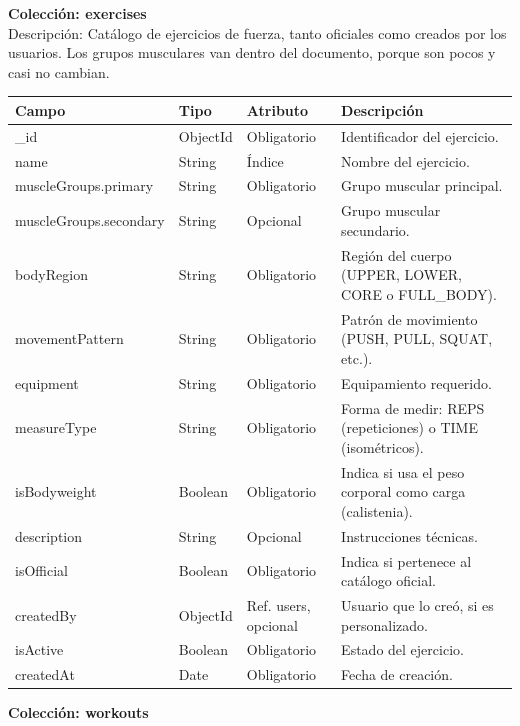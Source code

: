 \newpage
\noindent\textbf{Colección: exercises} \\
Descripción: Catálogo de ejercicios de fuerza, tanto oficiales como creados por los usuarios. Los grupos musculares van dentro del documento, porque son pocos y casi no cambian.
{\footnotesize
\renewcommand{\arraystretch}{1.2}
\begin{longtable}{|>{\raggedright\arraybackslash}p{4.7cm}|>{\raggedright\arraybackslash}p{1.8cm}|>{\raggedright\arraybackslash}p{2.3cm}|>{\raggedright\arraybackslash}p{5.4cm}|}
    \hline
    \rowcolor[HTML]{EFEFEF}
    \textbf{Campo} & \textbf{Tipo} & \textbf{Atributo} & \textbf{Descripción} \\ \hline
    \endhead
    \_id & ObjectId & Obligatorio & Identificador del ejercicio. \\ \hline
    name & String & Índice & Nombre del ejercicio. \\ \hline
    muscleGroups.\allowbreak primary & String & Obligatorio & Grupo muscular principal. \\ \hline
    muscleGroups.\allowbreak secondary & String & Opcional & Grupo muscular secundario. \\ \hline
    bodyRegion & String & Obligatorio & Región del cuerpo (UPPER, LOWER, CORE o FULL\_BODY). \\ \hline
    movementPattern & String & Obligatorio & Patrón de movimiento (PUSH, PULL, SQUAT, etc.). \\ \hline
    equipment & String & Obligatorio & Equipamiento requerido. \\ \hline
    measureType & String & Obligatorio & Forma de medir: REPS (repeticiones) o TIME (isométricos). \\ \hline
    isBodyweight & Boolean & Obligatorio & Indica si usa el peso corporal como carga (calistenia). \\ \hline
    description & String & Opcional & Instrucciones técnicas. \\ \hline
    isOfficial & Boolean & Obligatorio & Indica si pertenece al catálogo oficial. \\ \hline
    createdBy & ObjectId & Ref. users, opcional & Usuario que lo creó, si es personalizado. \\ \hline
    isActive & Boolean & Obligatorio & Estado del ejercicio. \\ \hline
    createdAt & Date & Obligatorio & Fecha de creación. \\ \hline
\end{longtable}
}
\newpage
\noindent\textbf{Colección: workouts} \\

